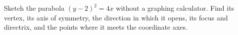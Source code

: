 Sketch the parabola $(y-2)^2=4x$ without a graphing calculator. Find its vertex, its axis of symmetry, the direction in which it opens, its focus and directrix, and the points where it meets the coordinate axes.
